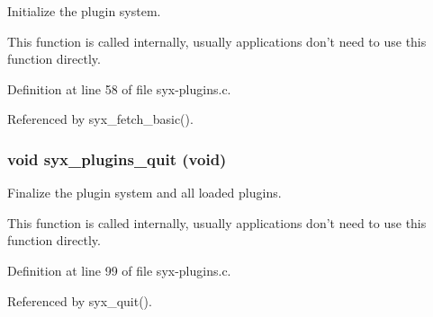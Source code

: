 Initialize the plugin system.

This function is called internally, usually applications don't need to use this function directly. 

Definition at line 58 of file syx-plugins.c.

Referenced by syx\_\-fetch\_\-basic().\hypertarget{syx-plugins_8c_a1d8890400fc665042cabbd6467ad38b}{
\subsubsection{\setlength{\rightskip}{0pt plus 5cm}void syx\_\-plugins\_\-quit (void)}}
\label{syx-plugins_8c_a1d8890400fc665042cabbd6467ad38b}


Finalize the plugin system and all loaded plugins.

This function is called internally, usually applications don't need to use this function directly. 

Definition at line 99 of file syx-plugins.c.

Referenced by syx\_\-quit().